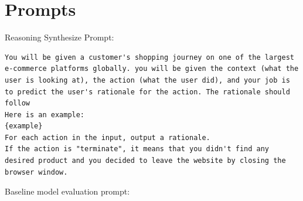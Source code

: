 \documentclass{article} %
\begin{document}
\section{Prompts}

Reasoning Synthesize Prompt:
\begin{verbatim}
You will be given a customer's shopping journey on one of the largest e-commerce platforms globally. you will be given the context (what the user is looking at), the action (what the user did), and your job is to predict the user's rationale for the action. The rationale should follow 
Here is an example:
{example}
For each action in the input, output a rationale.
If the action is "terminate", it means that you didn't find any desired product and you decided to leave the website by closing the browser window.
\end{verbatim}

Baseline model evaluation prompt:
\end{document}

